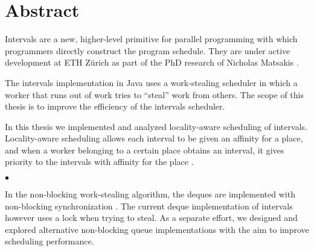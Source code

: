 
\chapter*{Abstract}
\label{chap:abstract}

Intervals \cite{Matsakis2009b} are a new, higher-level primitive for
parallel programming with which programmers directly construct the
program schedule. They are under active development at ETH Zürich as
part of the PhD research of Nicholas Matsakis \cite{Matsakis2010}.

The intervals implementation in Java uses a work-stealing scheduler in
which a worker that runs out of work tries to ``steal'' work from
others. The scope of this thesis is to improve the efficiency of the
intervals scheduler.

In this thesis we implemented and analyzed locality-aware scheduling of
intervals. Locality-aware scheduling allows each interval to be given
an affinity for a place, and when a worker belonging to a certain
place obtains an interval, it gives priority to the intervals with
affinity for the place \cite{Acar2002, Guo2010}.

\begin{center}
  $\bullet$
\end{center}

In the non-blocking work-stealing algorithm, the deques are
implemented with non-blocking synchronization \cite{Arora2001}. The
current deque implementation of intervals however uses a lock when
trying to steal. As a separate effort, we designed and explored
alternative non-blocking queue implementations with the aim to improve
scheduling performance.




